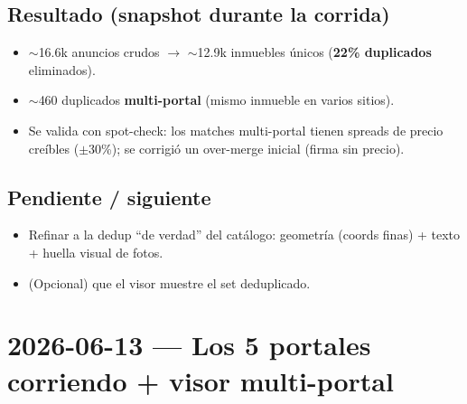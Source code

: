 \documentclass[11pt]{article}
\newcommand{\pend}{\item[\textcolor{acento}{$\square$}]}
\begin{document}
\subsection*{Resultado (snapshot durante la corrida)}
\begin{itemize}
  \item $\sim$16.6k anuncios crudos $\to$ $\sim$12.9k inmuebles únicos
        (\textbf{22\% duplicados} eliminados).
  \item $\sim$460 duplicados \textbf{multi-portal} (mismo inmueble en varios sitios).
  \item Se valida con spot-check: los matches multi-portal tienen spreads de precio
        creíbles ($\pm$30\%); se corrigió un over-merge inicial (firma sin precio).
\end{itemize}

\subsection*{Pendiente / siguiente}
\begin{itemize}
  \pend Refinar a la dedup ``de verdad'' del catálogo: geometría (coords finas) +
        texto + huella visual de fotos.
  \pend (Opcional) que el visor muestre el set deduplicado.
\end{itemize}

\section*{2026-06-13 — Los 5 portales corriendo + visor multi-portal}
\end{document}
